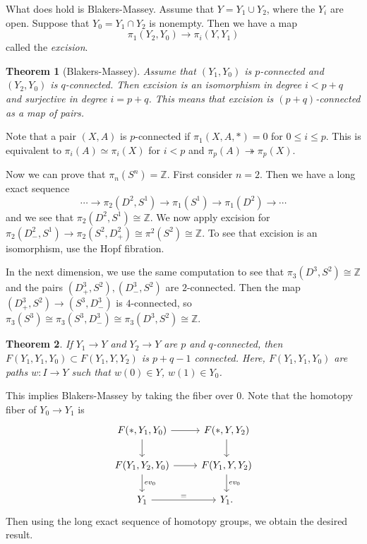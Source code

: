 \documentclass[leqno, openany]{memoir}
\newtheorem{thm}{Theorem}[section]
\theoremstyle{definition}
\theoremstyle{remark}
\theoremstyle{plain}
\theoremstyle{definition}
\theoremstyle{remark}
\newcommand{\Z}{\mathbb{Z}}
\begin{document}
What does hold is Blakers-Massey. Assume that $Y = Y_1 \cup Y_2$, where the $Y_i$ are open. Suppose that $Y_0 = Y_1 \cap Y_2$ is nonempty. Then we have a map
    \[ \pi_1(Y_2, Y_0) \to \pi_i(Y, Y_1) \]
    called the \textit{excision}. 

\begin{thm}[Blakers-Massey]
    Assume that $(Y_1, Y_0)$ is $p$-connected and $(Y_2, Y_0)$ is $q$-connected. Then excision is an isomorphism in degree $i < p+q$ and surjective in degree $i = p+q$. This means that excision is $(p+q)$-connected as a map of pairs.
\end{thm}

Note that a pair $(X,A)$ is $p$-connected if $\pi_1(X,A,*) = 0$ for $0 \leq i \leq p$. This is equivalent to $\pi_i(A) \simeq \pi_i(X)$ for $i < p$ and $\pi_p(A) \twoheadrightarrow \pi_p(X)$.

Now we can prove that $\pi_n(S^n) = \Z$. First consider $n = 2$. Then we have a long exact sequence
\[ \cdots \to \pi_2(D^2, S^1) \to \pi_1(S^1) \to \pi_1(D^2) \to \cdots \]
and we see that $\pi_2(D^2, S^1) \cong \Z$. We now apply excision for $\pi_2(D^2_-, S^1) \to \pi_2(S^2, D^2_+) \cong \pi^2(S^2) \cong \Z$. To see that excision is an isomorphism, use the Hopf fibration.

In the next dimension, we use the same computation to see that $\pi_3(D^3, S^2) \cong \Z$ and the pairs $(D^3_+, S^2), (D^3_-, S^2)$ are $2$-connected. Then the map $(D^3_+, S^2) \to (S^3, D^3_-)$ is $4$-connected, so $\pi_3(S^3) \cong \pi_3(S^3, D^3_-) \cong \pi_3(D^3, S^2) \cong \Z$.

\begin{thm}
    If $Y_1 \to Y$ and $Y_2 \to Y$ are $p$ and $q$-connected, then $F(Y_1, Y_1, Y_0) \subset F(Y_1, Y, Y_2)$ is $p + q - 1$ connected. Here, $F(Y_1, Y_1, Y_0)$ are paths $w \colon I \to Y$ such that $w(0) \in Y$, $w(1) \in Y_0$.
\end{thm}

This implies Blakers-Massey by taking the fiber over $0$. Note that the homotopy fiber of $Y_0 \to Y_1$ is 
\begin{equation*}
\begin{tikzcd}
    F(*, Y_1, Y_0) \arrow{d} \arrow{r} & F(*, Y, Y_2) \arrow{d} \\
    F(Y_1, Y_2, Y_0) \arrow{r} \arrow{d}{ev_0} & F(Y_1, Y, Y_2) \arrow{d}{ev_0} \\
    Y_1 \arrow{r}{=} & Y_1.
\end{tikzcd}
\end{equation*}
Then using the long exact sequence of homotopy groups, we obtain the desired result.
\end{document}
